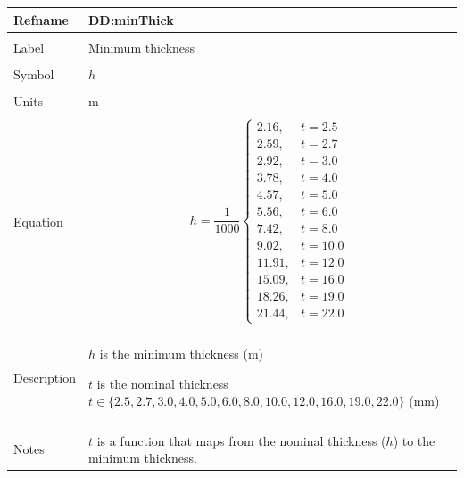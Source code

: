 \documentclass[12pt]{article}
\begin{document}
\vspace{\baselineskip}
\noindent
\begin{minipage}{\textwidth}
\begin{tabular}{>{\raggedright}p{}>{\raggedright\arraybackslash}p{}}
\toprule \textbf{Refname} & \textbf{DD:minThick}
\label{DD:minThick}
\\ \midrule \\
Label & Minimum thickness
        
\\ \midrule \\
Symbol & $h$
         
\\ \midrule \\
Units & m
        
\\ \midrule \\
Equation & \begin{displaymath}
           h=\frac{1}{1000} \begin{cases}
                            2.16, & t=2.5\\
                            2.59, & t=2.7\\
                            2.92, & t=3.0\\
                            3.78, & t=4.0\\
                            4.57, & t=5.0\\
                            5.56, & t=6.0\\
                            7.42, & t=8.0\\
                            9.02, & t=10.0\\
                            11.91, & t=12.0\\
                            15.09, & t=16.0\\
                            18.26, & t=19.0\\
                            21.44, & t=22.0
                            \end{cases}
           \end{displaymath}
\\ \midrule \\
Description & \begin{symbDescription}
              \item{$h$ is the minimum thickness (m)}
              \item{$t$ is the nominal thickness $t\in{}\{2.5,2.7,3.0,4.0,5.0,6.0,8.0,10.0,12.0,16.0,19.0,22.0\}$ (mm)}
              \end{symbDescription}
\\ \midrule \\
Notes & $t$ is a function that maps from the nominal thickness ($h$) to the minimum thickness.
        

\end{tabular}
\end{minipage}
\end{document}
